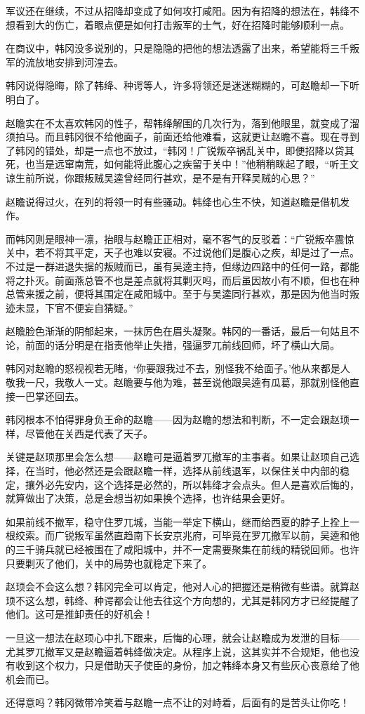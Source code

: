 军议还在继续，不过从招降却变成了如何攻打咸阳。因为有招降的想法在，韩绛不想看到大的伤亡，着眼点便是如何打击叛军的士气，好在招降时能够顺利一点。

在商议中，韩冈没多说别的，只是隐隐的把他的想法透露了出来，希望能将三千叛军的流放地安排到河湟去。

韩冈说得隐晦，除了韩绛、种谔等人，许多将领还是迷迷糊糊的，可赵瞻却一下听明白了。

赵瞻实在不太喜欢韩冈的性子，帮韩绛解围的几次行为，落到他眼里，就变成了溜须拍马。而且韩冈很不给他面子，前面还给他难看，这就更让赵瞻不喜。现在寻到了韩冈的错处，却是一点也不放过，“韩冈！广锐叛卒祸乱关中，即便招降以贷其死，也当是远窜南荒，如何能将此腹心之疾留于关中！”他稍稍眯起了眼，“听王文谅生前所说，你跟叛贼吴逵曾经同行甚欢，是不是有开释吴贼的心思？”

赵瞻说得过火，在列的将领一时有些骚动。韩绛也心生不快，知道赵瞻是借机发作。

而韩冈则是眼神一凛，抬眼与赵瞻正正相对，毫不客气的反驳着：“广锐叛卒震惊关中，若不将其平定，天子也难以安寝。不过说他们是腹心之疾，却是过了一点。不过是一群进退失据的叛贼而已，虽有吴逵主持，但缘边四路中的任何一路，都能将之扑灭。前面燕总管不也是差点就将其剿灭吗，而后虽因故小有不顺，但也在种总管来援之前，便将其围定在咸阳城中。至于与吴逵同行甚欢，那是因为他当时叛迹未显，下官不便妄自猜疑。”

赵瞻脸色渐渐的阴郁起来，一抹厉色在眉头凝聚。韩冈的一番话，最后一句姑且不论，前面的话分明是在指责他举止失措，强逼罗兀前线回师，坏了横山大局。

韩冈对赵瞻的怒视视若无睹，‘你要跟我过不去，别怪我不给面子。’他从来都是人敬我一尺，我敬人一丈。赵瞻要与他为难，甚至说他跟吴逵有瓜葛，那就别怪他直接一巴掌还回去。

韩冈根本不怕得罪身负王命的赵瞻——因为赵瞻的想法和判断，不一定会跟赵顼一样，尽管他在关西是代表了天子。

关键是赵顼那里会怎么想——赵瞻可是逼着罗兀撤军的主事者。如果让赵顼自己选择，在当时，他必然还是会跟赵瞻一样，选择从前线退军，以保住关中内部的稳定，攘外必先安内，这个选择是必然的，所以韩绛才会点头。但人是喜欢后悔的，就算做出了决策，总是会想当初如果换个选择，也许结果会更好。

如果前线不撤军，稳守住罗兀城，当能一举定下横山，继而给西夏的脖子上拴上一根绞索。而广锐叛军虽然直趋南下长安京兆府，可毕竟在罗兀撤军以前，吴逵和他的三千骑兵就已经被围在了咸阳城中，并不一定需要聚集在前线的精锐回师。也许只要剿灭了他们，关中的局势也就稳定下来了。

赵顼会不会这么想？韩冈完全可以肯定，他对人心的把握还是稍微有些谱。就算赵顼不这么想，韩绛、种谔都会让他去往这个方向想的，尤其是韩冈方才已经提醒了他们。这可是推卸责任的好机会！

一旦这一想法在赵顼心中扎下跟来，后悔的心理，就会让赵瞻成为发泄的目标——尤其罗兀撤军又是赵瞻逼着韩绛做决定。从程序上说，这其实并不合规矩，他也没有收到这个权力，只是借助天子使臣的身份，加之韩绛本身又有些灰心丧意给了他机会而已。

还得意吗？韩冈微带冷笑着与赵瞻一点不让的对峙着，后面有的是苦头让你吃！

